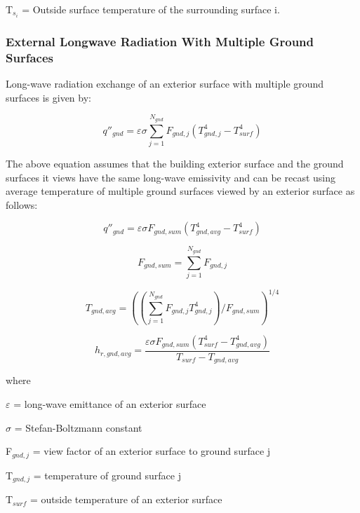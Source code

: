 T\(_{s_i}\) = Outside surface temperature of the surrounding surface i.

\subsubsection{External Longwave Radiation With Multiple Ground Surfaces}\label{external-longwave-radiation-with-multiple-ground-surfaces}

Long-wave radiation exchange of an exterior surface with multiple ground surfaces is given by:

\begin{equation}
{q''_{gnd}} = \varepsilon \sigma \sum\limits_{j = 1}^{{N_{gnd}}} {F_{gnd,j}} \left(T_{gnd,j}^4 - T_{surf}^4 \right)
\end{equation}

The above equation assumes that the building exterior surface and the ground surfaces it views have the same long-wave emissivity and can be recast using average temperature of multiple ground surfaces viewed by an exterior surface as follows:

\begin{equation}
{q''_{gnd}} = \varepsilon \sigma {F_{gnd,sum}} (T_{gnd,avg}^4 - T_{surf}^4)
\end{equation}

\begin{equation}
{F_{gnd,sum}} = \sum\limits_{j = 1}^{{N_{gnd}}} {F_{gnd,j}}
\end{equation}

\begin{equation}
{T_{gnd,avg}} = ((\sum\limits_{j = 1}^{{N_{gnd}}} {F_{gnd,j}} {T_{gnd,j}^4}) / {F_{gnd,sum}})^{1/4}
\end{equation}

\begin{equation}
{h_{r,gnd,avg}} = \frac{{\varepsilon \sigma {F_{gnd, sum}}(T_{surf}^4 - T_{gnd,avg}^4)}}{{{T_{surf}} - {T_{gnd,avg}}}}
\end{equation}

where

$\varepsilon$ = long-wave emittance of an exterior surface

$\sigma$ = Stefan-Boltzmann constant

F\(_{gnd,j}\) = view factor of an exterior surface to ground surface j

T\(_{gnd,j}\) = temperature of ground surface j

T\(_{surf}\) = outside temperature of an exterior surface

